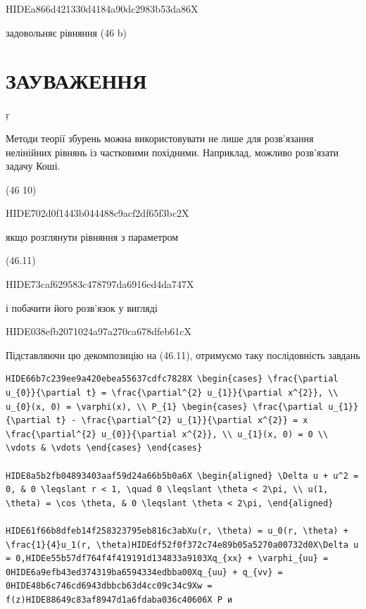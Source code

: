 \documentclass[
  ukrainian,
]{article}
\begin{document}
HIDEa866d421330d4184a90dc2983b53da86X

задовольняє рівняння (46 b)

\section{ЗАУВАЖЕННЯ}\label{ux437ux430ux443ux432ux430ux436ux435ux43dux43dux44f-2}

ŗ

Методи теорії збурень можна використовувати не лише для розв'язання
нелінійних рівнянь із частковими похідними. Наприклад, можливо
розв'язати задачу Коші.

(46 10)

HIDE702d0f1443b044488c9acf2df65f3bc2X

якщо розглянути рівняння з параметром

(46.11)

HIDE73caf629583c478797da6916ed4da747X

і побачити його розв'язок у вигляді

HIDE038efb2071024a97a270ca678dfeb61cX

Підставляючи цю декомпозицію на (46.11), отримуємо таку послідовність
завдань

\begin{verbatim}
HIDE66b7c239ee9a420ebea55637cdfc7828X \begin{cases} \frac{\partial u_{0}}{\partial t} = \frac{\partial^{2} u_{1}}{\partial x^{2}}, \\ u_{0}(x, 0) = \varphi(x), \\ P_{1} \begin{cases} \frac{\partial u_{1}}{\partial t} - \frac{\partial^{2} u_{1}}{\partial x^{2}} = x \frac{\partial^{2} u_{0}}{\partial x^{2}}, \\ u_{1}(x, 0) = 0 \\ \vdots & \vdots \end{cases} \end{cases}

HIDE8a5b2fb04893403aaf59d24a66b5b0a6X \begin{aligned} \Delta u + u^2 = 0, & 0 \leqslant r < 1, \quad 0 \leqslant \theta < 2\pi, \\ u(1, \theta) = \cos \theta, & 0 \leqslant \theta < 2\pi, \end{aligned}

HIDE61f66b8dfeb14f258323795eb816c3abXu(r, \theta) = u_0(r, \theta) + \frac{1}{4}u_1(r, \theta)HIDEdf52f0f372c74e89b05a5270a00732d0X\Delta u = 0,HIDEe55b57df764f4f419191d134833a9103Xq_{xx} + \varphi_{uu} = 0HIDE6a9efb43ed374319ba6594334edbba00Xq_{uu} + q_{vv} = 0HIDE48b6c746cd6943dbbcb63d4cc09c34c9Xw = f(z)HIDE88649c83af8947d1a6fdaba036c40606X Р и
\end{verbatim}
\end{document}
